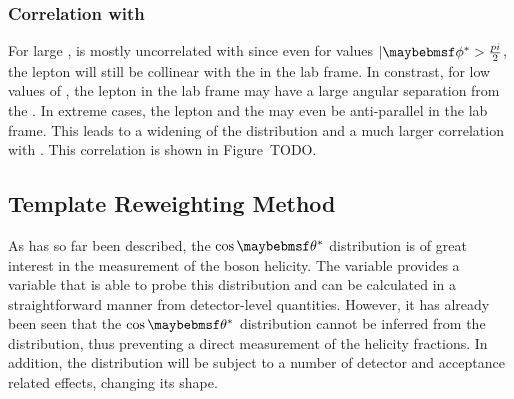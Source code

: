\subsubsection{Correlation with \phistar}
For large \PtW, \LP is mostly uncorrelated with \phistar since even for values
$|\phistar > \frac{\pi}{2}$, the lepton will still be collinear with the \PW in
the lab frame. In constrast, for low values of \PtW, the lepton in the lab frame
may have a large angular separation from the \PW. In extreme cases, the lepton
and the \PW may even be anti-parallel in the lab frame. This leads to a widening
of the \LP distribution and a much larger correlation with
\phistar. This correlation is shown in Figure~TODO.

\subsection{Template Reweighting Method}
\label{sec:wpol_reweighting}
As has so far been described, the $\cos\thetastar$ distribution is of great
interest in the measurement of the \PW boson helicity. The \LP variable provides
a variable that is able to probe this distribution and can be calculated in a
straightforward manner from detector-level quantities. However, it has already
been seen that the $\cos\thetastar$ distribution cannot be inferred from the \LP
distribution, thus preventing a direct measurement of the helicity
fractions. In addition, the \LP distribution will be subject to a number of
detector and acceptance related effects, changing its shape.

